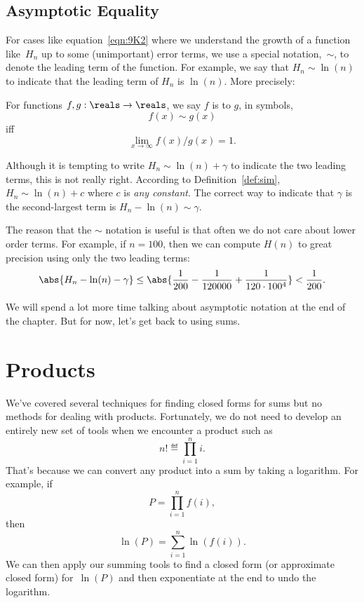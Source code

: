\subsection{Asymptotic Equality}\label{sec:asymptotic_equality}

For cases like equation~\ref{eqn:9K2} where we understand the growth
of a function like~$H_n$ up to some (unimportant) error terms, we use
a special notation,~$\sim$, to denote the leading term of the
function.  For example, we say that $H_n \sim \ln(n)$ to indicate that
the leading term of $H_n$ is $\ln(n)$.  More precisely:
\begin{definition}\label{def:sim}
  For functions $f,g: \reals \to \reals$, we say $f$ is  to $g$, in symbols,
\[
f(x) \sim g(x)
\]
iff
\[
\lim_{x \rightarrow \infty} f(x)/g(x) = 1.
\]
\end{definition}

Although it is tempting to write $H_n \sim \ln(n) + \gamma$ to indicate
the two leading terms, this is not really right.  According to
Definition~\ref{def:sim}, $H_n \sim \ln(n) + c$ where $c$ is \emph{any
  constant}.  The correct way to indicate that $\gamma$ is the
second-largest term is $H_n - \ln(n) \sim \gamma$.

The reason that the $\sim$ notation is useful is that often we do not care
about lower order terms.  For example, if $n = 100$, then we can compute
$H(n)$ to great precision using only the two leading terms:
\[
\abs{H_n - \ln(n) - \gamma} \leq \abs{\frac{1}{200} - \frac{1}{120000} +
\frac{1}{120 \cdot 100^4}} < \frac{1}{200}.
\]

We will spend a lot more time talking about asymptotic notation at the
end of the chapter.  But for now, let's get back to using sums.

\begin{problems}
\classproblems
{}

\homeworkproblems
{}

\end{problems}

\section{Products}\label{sec:closed_products}

We've covered several techniques for finding closed forms for sums but
no methods for dealing with products.  Fortunately, we do not need to
develop an entirely new set of tools when we encounter a product such
as
\begin{equation}\label{eqn:9P1}
    n! \eqdef \prod_{i = 1}^n i.
\end{equation}
That's because we can convert any product into a sum by taking a
logarithm.  For example, if
\[
    P = \prod_{i  = 1}^n f(i),
\]
then
\[
    \ln(P) = \sum_{i = 1}^n \ln(f(i)).
\]
We can then apply our summing tools to find a closed form (or
approximate closed form) for~$\ln(P)$ and then exponentiate at the end
to undo the logarithm.

